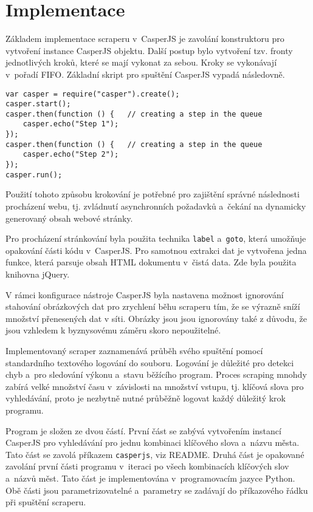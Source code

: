 \documentclass[11pt,a4paper]{article}
\begin{document}
\section{Implementace}
Základem implementace scraperu v~CasperJS je zavolání konstruktoru pro vytvoření instance CasperJS objektu. Další postup bylo vytvoření tzv. fronty jednotlivých kroků, které se mají vykonat za sebou. Kroky se vykonávají v~pořadí FIFO. Základní skript pro spuštění CasperJS vypadá následovně.

\begin{lstlisting}[caption=Základní skript pro CasperJS]
var casper = require("casper").create();
casper.start();
casper.then(function () {   // creating a step in the queue
    casper.echo("Step 1");
});
casper.then(function () {   // creating a step in the queue
    casper.echo("Step 2");
});
casper.run();
\end{lstlisting}

Použití tohoto způsobu krokování je potřebné pro zajištění správné následnosti procházení webu, tj. zvládnutí asynchronních požadavků a~čekání na dynamicky generovaný obsah webové stránky.

Pro procházení stránkování byla použita technika \texttt{label} a~\texttt{goto}, která umožňuje opakování části kódu v~CasperJS. Pro samotnou extrakci dat je vytvořena jedna funkce, která parsuje obsah HTML dokumentu v~čistá data. Zde byla použita knihovna jQuery.

V rámci konfigurace nástroje CasperJS byla nastavena možnost ignorování stahování obrázkových dat pro zrychlení běhu scraperu tím, že se výrazně sníží množství přenesených dat v síti. Obrázky jsou jsou ignorovány také z důvodu, že jsou vzhledem k byznysovému záměru skoro nepoužitelné.

Implementovaný scraper zaznamenává průběh svého spuštění pomocí standardního textového logování do souboru. Logování je důležité pro detekci chyb a~pro sledování výkonu a~stavu běžícího program. Proces scraping mnohdy zabírá velké množství času v~závislosti na množství vstupu, tj. klíčová slova pro vyhledávání, proto je nezbytně nutné průběžně logovat každý důležitý krok programu.

Program je složen ze dvou částí. První část se zabývá vytvořením instancí CasperJS pro vyhledávání pro jednu kombinaci klíčového slova a~názvu města. Tato část se zavolá příkazem \texttt{casperjs}, viz README. Druhá část je opakované zavolání první části programu v~iteraci po všech kombinacích klíčových slov a~názvů měst. Tato část je implementována v~programovacím jazyce Python. Obě části jsou parametrizovatelné a~parametry se zadávají do příkazového řádku při spuštění scraperu.
\end{document}
